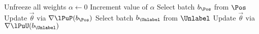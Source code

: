 \begin{algorithmic}[1]
  \State Unfreeze all weights
  \State $\alpha \gets 0$
    \State Increment value of $\alpha$ 
      \State Select batch $b_{\Pos}$ from $\Pos$
      \State Update $\vec{\theta}$ via $\nabla\lPuP(b_{\Pos})$
      \State Select batch $b_{\Unlabel}$ from $\Unlabel$
      \State Update $\vec{\theta}$ via $\nabla\lPuU(b_{\Unlabel})$
    \EndWhile
  \EndWhile
\end{algorithmic}
